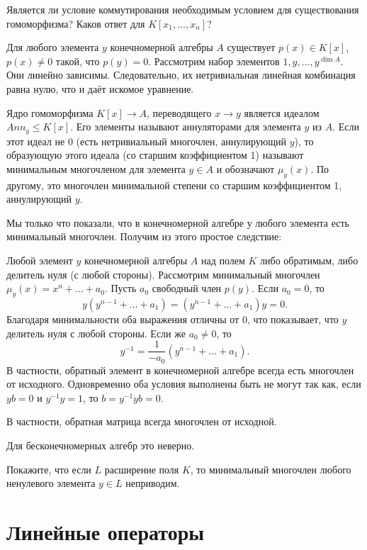 \upr Является ли условие коммутирования необходимым условием для существования гомоморфизма? Каков ответ для $K[x_1,\dots,x_n]$?
\eupr




\utv Для любого элемента $y$ конечномерной алгебры $A$ существует $p(x)\in K[x]$, $p(x)\neq 0$ такой, что $p(y)=0$.
\proof Рассмотрим набор элементов $1,y,\dots, y^{\dim A}$. Они линейно зависимы. Следовательно, их нетривиальная линейная комбинация равна нулю, что и даёт искомое уравнение.
\endproof
\eutv


\dfn Ядро гомоморфизма $K[x] \to A$, переводящего $x \to y$ является идеалом  $Ann_y\leq K[x]$. Его элементы называют аннуляторами для элемента $y$ из $A$. Если этот идеал не 0 (есть нетривиальный многочлен, аннулирующий $y$), то образующую этого идеала (со старшим коэффициентом 1) называют минимальным многочленом для элемента $y\in A$ и обозначают $\mu_y(x)$. По другому, это многочлен минимальной степени со старшим коэффициентом 1, аннулирующий $y$.
\edfn

Мы только что показали, что в конечномерной алгебре у любого элемента есть минимальный многочлен. Получим из этого простое следствие:

\thrm Любой элемент $y$ конечномерной алгебры $A$ над полем $K$ либо обратимым, либо делитель нуля (с любой стороны).
\proof Рассмотрим минимальный многочлен $\mu_y(x)= x^n+ \dots+a_0$. Пусть $a_0$ свободный член $p(y)$. Если $a_0=0$, то $$y(y^{n-1}+
\dots + a_1)=(y^{n-1}+
\dots + a_1)y=0.$$ Благодаря минимальности оба выражения отличны от 0, что показывает, что $y$ делитель нуля с любой стороны. Если же $a_0\neq 0$, то $$y^{-1}=\frac{1}{-a_0}(y^{n-1}+
\dots + a_1).$$ В частности, обратный элемент в конечномерной алгебре всегда есть многочлен от исходного. Одновременно оба условия выполнены быть не могут так как, если $yb=0$ и $y^{-1}y=1$, то $b=y^{-1}yb=0$.
\endproof
\ethrm

\rm В частности, обратная матрица всегда многочлен от исходной.
\erm

\upr Для бесконечномерных алгебр это неверно.
\eupr

\upr Покажите, что если $L$ расширение поля $K$, то минимальный многочлен любого ненулевого элемента $y\in L$ неприводим.
\eupr





\section{Линейные операторы}

